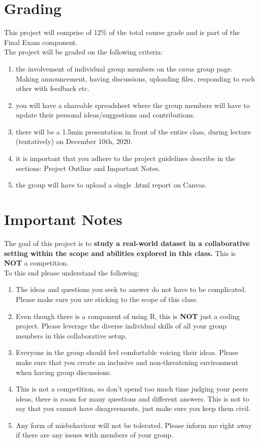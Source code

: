 \documentclass[11pt]{article}
\begin{document}
\section{Grading}
This project will comprise of 12\% of the total course grade and is part of the Final Exam component. 
\\
The project will be graded on the following criteria:
\begin{enumerate}
\item the involvement of individual group members on the cavas group page. Making announcement, having discussions, uploading files, responding to each other with feedback etc.
\item you will have a shareable spreadsheet where the group members will have to update their personal ideas/suggestions and contributions.
\item there will be a 1.5min presentation in front of the entire class, during lecture (tentatively) on December 10th, 2020. 
\item it is important that you adhere to the project guidelines describe in the sections: Project Outline and Important Notes. 
\item the group will have to upload a single .html report on Canvas.
\end{enumerate}

\section{Important Notes}
The goal of this project is to \textbf{study a real-world dataset in a collaborative setting within the scope and abilities explored in this class.} This is \textbf{NOT} a competition. 
\\
To this end please understand the following:
\begin{enumerate}
\item The ideas and questions you seek to answer do not have to be complicated. Please make sure you are sticking to the scope of this class. 
\item Even though there is a component of using R, this is \textbf{NOT} just a coding project. Please leverage the diverse individual skills of all your group members in this collaborative setup. 
\item Everyone in the group should feel comfortable voicing their ideas. Please make sure that you create an inclusive and non-threatening environment when having group discussions.
\item This is not a competition, so don't spend too much time judging your peers ideas, there is room for many questions and different answers. This is not to say that you cannot have disagreements, just make sure you keep them civil.   
\item Any form of misbehaviour will not be tolerated. Please inform me right away if there are any issues with members of your group. 
\end{enumerate}
\end{document}
